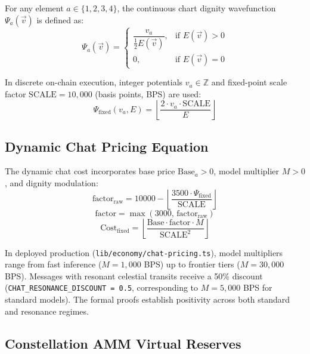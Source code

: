 \documentclass[11pt,a4paper]{article}
\theoremstyle{plain}
\theoremstyle{definition}
\theoremstyle{remark}
\begin{document}
For any element $a \in \{1, 2, 3, 4\}$, the continuous chart dignity wavefunction $\Psi_a(\vec{v})$ is defined as:
\begin{equation}
    \Psi_a(\vec{v}) = 
    \begin{cases}
        \dfrac{v_a}{\frac{1}{2} E(\vec{v})}, & \text{if } E(\vec{v}) > 0 \\
        0, & \text{if } E(\vec{v}) = 0
    \end{cases}
\end{equation}

In discrete on-chain execution, integer potentials $v_a \in \mathbb{Z}$ and fixed-point scale factor $\text{SCALE} = 10,000$ (basis points, BPS) are used:
\begin{equation}
    \Psi_{\text{fixed}}(v_a, E) = \left\lfloor \frac{2 \cdot v_a \cdot \text{SCALE}}{E} \right\rfloor
\end{equation}

\subsection{Dynamic Chat Pricing Equation}

The dynamic chat cost incorporates base price $\text{Base}_a > 0$, model multiplier $M > 0$, and dignity modulation:
\begin{equation}
    \text{factor}_{\text{raw}} = 10000 - \left\lfloor \frac{3500 \cdot \Psi_{\text{fixed}}}{\text{SCALE}} \right\rfloor
\end{equation}
\begin{equation}
    \text{factor} = \max(3000,\, \text{factor}_{\text{raw}})
\end{equation}
\begin{equation}
    \text{Cost}_{\text{fixed}} = \left\lfloor \frac{\text{Base} \cdot \text{factor} \cdot M}{\text{SCALE}^2} \right\rfloor
\end{equation}

In deployed production (\texttt{lib/economy/chat-pricing.ts}), model multipliers range from fast inference ($M = 1,000$ BPS) up to frontier tiers ($M = 30,000$ BPS). Messages with resonant celestial transits receive a 50\% discount (\texttt{CHAT\_RESONANCE\_DISCOUNT = 0.5}, corresponding to $M = 5,000$ BPS for standard models). The formal proofs establish positivity across both standard and resonance regimes.

\subsection{Constellation AMM Virtual Reserves}
\end{document}

